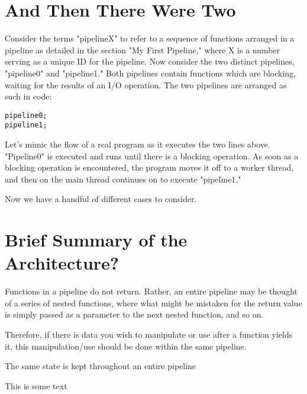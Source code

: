 \documentclass[./LRM_main.tex]{subfiles}
\begin{document}
\section{And Then There Were Two}

Consider the terms "pipelineX" to refer to a sequence of functions arranged in a pipeline as detailed in the section "My First Pipeline," where X is a number serving as a unique ID for the pipeline. Now consider the two distinct pipelines, "pipeline0" and "pipeline1." Both pipelines contain functions which are blocking, waiting for the results of an I/O operation. The two pipelines are arranged as such in code:
\begin{lstlisting}
pipeline0;
pipeline1;
\end{lstlisting}
Let's mimic the flow of a real program as it executes the two lines above. "Pipeline0" is executed and runs until there is a blocking operation. As soon as a blocking operation is encountered, the program moves it off to a worker thread, and then on the main thread continues on to execute "pipeline1."  

Now we have a handful of different cases to consider.



\section{Brief Summary of the Architecture?}
Functions in a pipeline do not return. Rather, an entire pipeline may be thought of a series of nested functions, where what might be mistaken for the return value is simply passed as a parameter to the next nested function, and so on. 

Therefore, if there is data you wish to manipulate or use after a function yields it, this manipulation/use should be done within the same pipeline.

The same state is kept throughout an entire pipeline

This is some text
\end{document}
